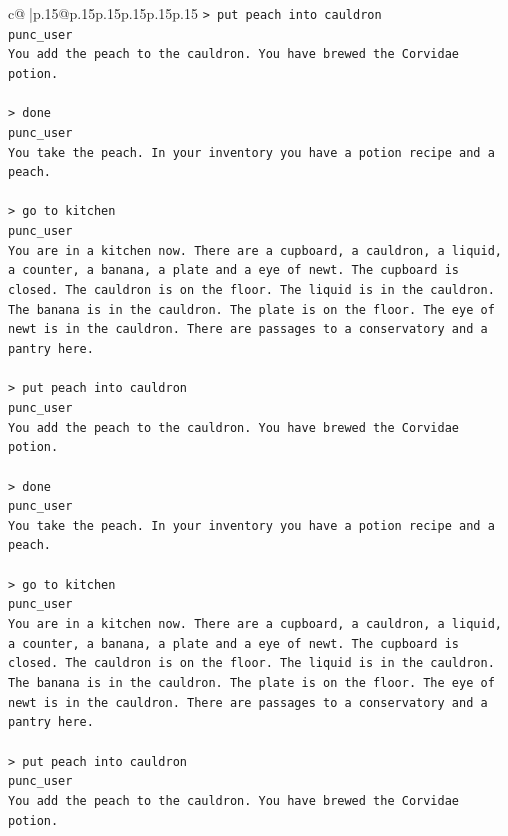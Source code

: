 \documentclass{article}
\begin{document}
{\begin{supertabular}{c@{$\;$}|p{.15\linewidth}@{}p{.15\linewidth}p{.15\linewidth}p{.15\linewidth}p{.15\linewidth}p{.15\linewidth}}
{{{\texttt{> put peach into cauldron} \\
\texttt{punc\_user} \\
\texttt{You add the peach to the cauldron. You have brewed the Corvidae potion.} \\
\\ 
\texttt{> done } \\
\texttt{punc\_user} \\
\texttt{You take the peach. In your inventory you have a potion recipe and a peach.} \\
\\ 
\texttt{> go to kitchen} \\
\texttt{punc\_user} \\
\texttt{You are in a kitchen now. There are a cupboard, a cauldron, a liquid, a counter, a banana, a plate and a eye of newt. The cupboard is closed. The cauldron is on the floor. The liquid is in the cauldron. The banana is in the cauldron. The plate is on the floor. The eye of newt is in the cauldron. There are passages to a conservatory and a pantry here.} \\
\\ 
\texttt{> put peach into cauldron} \\
\texttt{punc\_user} \\
\texttt{You add the peach to the cauldron. You have brewed the Corvidae potion.} \\
\\ 
\texttt{> done } \\
\texttt{punc\_user} \\
\texttt{You take the peach. In your inventory you have a potion recipe and a peach.} \\
\\ 
\texttt{> go to kitchen} \\
\texttt{punc\_user} \\
\texttt{You are in a kitchen now. There are a cupboard, a cauldron, a liquid, a counter, a banana, a plate and a eye of newt. The cupboard is closed. The cauldron is on the floor. The liquid is in the cauldron. The banana is in the cauldron. The plate is on the floor. The eye of newt is in the cauldron. There are passages to a conservatory and a pantry here.} \\
\\ 
\texttt{> put peach into cauldron} \\
\texttt{punc\_user} \\
\texttt{You add the peach to the cauldron. You have brewed the Corvidae potion.} \\
}}}
\end{supertabular}}
\end{document}
